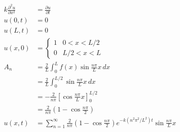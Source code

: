 \documentclass{article}
\begin{document}
\begin{align*}
  k \frac{\partial^2 u}{\partial x^2} & = \frac{\partial u}{\partial t}                                                                                                \\
  u(0, t)                             & = 0                                                                                                                            \\
  u(L, t)                             & = 0                                                                                                                            \\
  u(x, 0)                             & = \begin{cases}
                                            1 & 0 < x < L / 2 \\
                                            0 & L / 2 < x < L
                                          \end{cases}                                                                                                            \\
  A_n                                 & = \frac{2}{L} \int_0^L f(x) \sin \frac{n \pi}{L} x \,d x                                                                       \\
                                      & = \frac{2}{L} \int_0^{L / 2} \sin \frac{n \pi}{L} x \,d x                                                                      \\
                                      & = -\frac{2}{n \pi} \left[ \cos \frac{n \pi}{L} x \right]_0^{L / 2}                                                             \\
                                      & = \frac{2}{n \pi} \left( 1 - \cos \frac{n \pi}{2} \right)                                                                      \\
  u(x, t)                             & = \sum_{n = 1}^\infty \frac{2}{n \pi} \left( 1 - \cos \frac{n \pi}{2} \right) e^{-k (n^2 \pi^2 /L^2) t} \sin \frac{n \pi}{L} x
\end{align*}

\setcounter{subsubsection}{2}
\subsubsection{}
\end{document}

